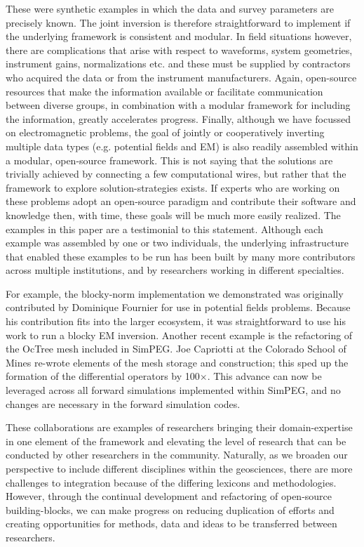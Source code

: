 \documentclass[paper]{geophysics}
\begin{document}
These were synthetic examples in which the data and survey parameters are precisely known. The joint inversion is therefore straightforward to implement if the underlying framework is consistent and modular. In field situations however, there are complications that arise with respect to waveforms, system geometries, instrument gains, normalizations etc. and these must be supplied by contractors who acquired the data or from the instrument manufacturers. Again, open-source resources that make the information available or facilitate communication between diverse groups, in combination with a modular framework for including the information, greatly accelerates progress. Finally, although we have focussed on electromagnetic problems, the goal of jointly or cooperatively inverting multiple data types (e.g. potential fields and EM) is also readily assembled within a modular, open-source framework. This is not saying that the solutions are trivially achieved by connecting a few computational wires, but rather that the framework to explore solution-strategies exists. If experts who are working on these problems adopt an open-source paradigm and contribute their software and knowledge then, with time, these goals will be much more easily realized. The examples in this paper are a testimonial to this statement. Although each example was assembled by one or two individuals, the underlying infrastructure that enabled these examples to be run has been built by many more contributors across multiple institutions, and by researchers working in different specialties.

For example, the blocky-norm implementation we demonstrated was originally contributed by Dominique Fournier for use in potential fields problems. Because his contribution fits into the larger ecosystem, it was straightforward to use his work to run a blocky EM inversion. Another recent example is the refactoring of the OcTree mesh included in SimPEG. Joe Capriotti at the Colorado School of Mines re-wrote elements of the mesh storage and construction; this sped up the formation of the differential operators by 100$\times$. This advance can now be leveraged across all forward simulations implemented within SimPEG, and no changes are necessary in the forward simulation codes.

These collaborations are examples of researchers bringing their domain-expertise in one element of the framework and elevating the level of research that can be conducted by other researchers in the community. Naturally, as we broaden our perspective to include different disciplines within the geosciences,  there are more challenges to integration because of the differing lexicons and methodologies. However, through the continual development and refactoring of open-source building-blocks, we can make progress on reducing duplication of efforts and creating opportunities for methods, data and ideas to be transferred between researchers.
\end{document}
